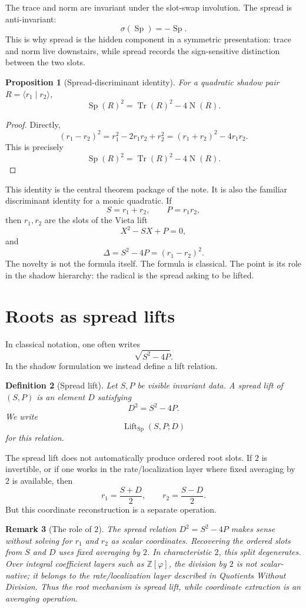 \documentclass[11pt]{article}
\newtheorem{definition}{Definition}[section]
\newtheorem{proposition}[definition]{Proposition}
\newtheorem{remark}[definition]{Remark}
\newcommand{\Tr}{\operatorname{Tr}}
\newcommand{\Nm}{\operatorname{N}}
\newcommand{\Sp}{\operatorname{Sp}}
\newcommand{\Lift}{\operatorname{Lift}}
\newcommand{\sig}{\sigma}
\newcommand{\ph}{\varphi}
\newcommand{\Z}{\mathbb{Z}}
\begin{document}
The trace and norm are invariant under the slot-swap involution.  The spread is anti-invariant:
\[
    \sig(\Sp)=-\Sp.
\]
This is why spread is the hidden component in a symmetric presentation: trace and norm live downstairs, while spread records the sign-sensitive distinction between the two slots.

\begin{proposition}[Spread-discriminant identity]\label{prop:spread-discriminant}
For a quadratic shadow pair $R=\langle r_1\mid r_2\rangle$,
\[
    \Sp(R)^2=\Tr(R)^2-4\Nm(R).
\]
\end{proposition}

\begin{proof}
Directly,
\[
    (r_1-r_2)^2
    =r_1^2-2r_1r_2+r_2^2
    =(r_1+r_2)^2-4r_1r_2.
\]
This is precisely
\[
    \Sp(R)^2=\Tr(R)^2-4\Nm(R).
\]
\end{proof}

This identity is the central theorem package of the note.  It is also the familiar discriminant identity for a monic quadratic.  If
\[
    S=r_1+r_2,
    \qquad
    P=r_1r_2,
\]
then $r_1,r_2$ are the slots of the Vieta lift
\[
    X^2-SX+P=0,
\]
and
\[
    \Delta=S^2-4P=(r_1-r_2)^2.
\]
The novelty is not the formula itself.  The formula is classical.  The point is its role in the shadow hierarchy: the radical is the spread asking to be lifted.

\section{Roots as spread lifts}

In classical notation, one often writes
\[
    \sqrt{S^2-4P}.
\]
In the shadow formulation we instead define a lift relation.

\begin{definition}[Spread lift]
Let $S,P$ be visible invariant data.  A spread lift of $(S,P)$ is an element $D$ satisfying
\[
    D^2=S^2-4P.
\]
We write
\[
    \Lift_{\Sp}(S,P;D)
\]
for this relation.
\end{definition}

The spread lift does not automatically produce ordered root slots.  If $2$ is invertible, or if one works in the rate/localization layer where fixed averaging by $2$ is available, then
\[
    r_1=\frac{S+D}{2},
    \qquad
    r_2=\frac{S-D}{2}.
\]
But this coordinate reconstruction is a separate operation.

\begin{remark}[The role of $2$]
The spread relation $D^2=S^2-4P$ makes sense without solving for $r_1$ and $r_2$ as scalar coordinates.  Recovering the ordered slots from $S$ and $D$ uses fixed averaging by $2$.  In characteristic $2$, this split degenerates.  Over integral coefficient layers such as $\Z[\ph]$, the division by $2$ is not scalar-native; it belongs to the rate/localization layer described in \emph{Quotients Without Division}.  Thus the root mechanism is spread lift, while coordinate extraction is an averaging operation.
\end{remark}
\end{document}
